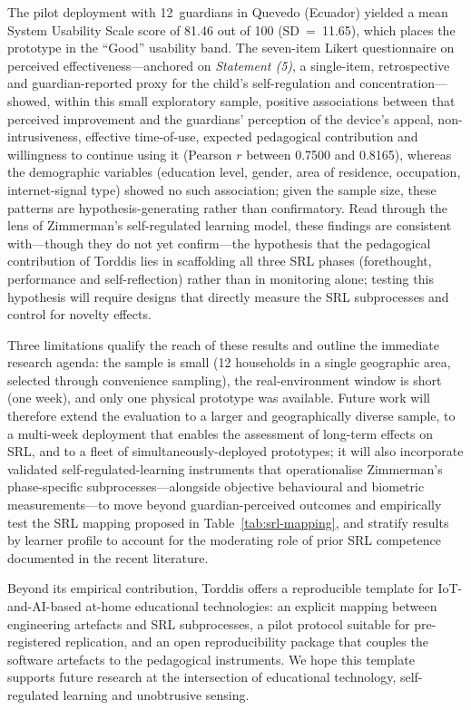 The pilot deployment with 12~guardians in Quevedo (Ecuador) yielded a mean System Usability Scale score of 81.46 out of 100 (SD~=~11.65), which places the prototype in the ``Good'' usability band. The seven-item Likert questionnaire on perceived effectiveness---anchored on \textit{Statement (5)}, a single-item, retrospective and guardian-reported proxy for the child's self-regulation and concentration---showed, within this small exploratory sample, positive associations between that perceived improvement and the guardians' perception of the device's appeal, non-intrusiveness, effective time-of-use, expected pedagogical contribution and willingness to continue using it (Pearson $r$ between 0.7500 and 0.8165), whereas the demographic variables (education level, gender, area of residence, occupation, internet-signal type) showed no such association; given the sample size, these patterns are hypothesis-generating rather than confirmatory. Read through the lens of Zimmerman's self-regulated learning model, these findings are consistent with---though they do not yet confirm---the hypothesis that the pedagogical contribution of Torddis lies in scaffolding all three SRL phases (forethought, performance and self-reflection) rather than in monitoring alone; testing this hypothesis will require designs that directly measure the SRL subprocesses and control for novelty effects.

Three limitations qualify the reach of these results and outline the immediate research agenda: the sample is small (12 households in a single geographic area, selected through convenience sampling), the real-environment window is short (one week), and only one physical prototype was available. Future work will therefore extend the evaluation to a larger and geographically diverse sample, to a multi-week deployment that enables the assessment of long-term effects on SRL, and to a fleet of simultaneously-deployed prototypes; it will also incorporate validated self-regulated-learning instruments that operationalise Zimmerman's phase-specific subprocesses---alongside objective behavioural and biometric measurements---to move beyond guardian-perceived outcomes and empirically test the SRL mapping proposed in Table~\ref{tab:srl-mapping}, and stratify results by learner profile to account for the moderating role of prior SRL competence documented in the recent literature.

Beyond its empirical contribution, Torddis offers a reproducible template for IoT-and-AI-based at-home educational technologies: an explicit mapping between engineering artefacts and SRL subprocesses, a pilot protocol suitable for pre-registered replication, and an open reproducibility package that couples the software artefacts to the pedagogical instruments. We hope this template supports future research at the intersection of educational technology, self-regulated learning and unobtrusive sensing.